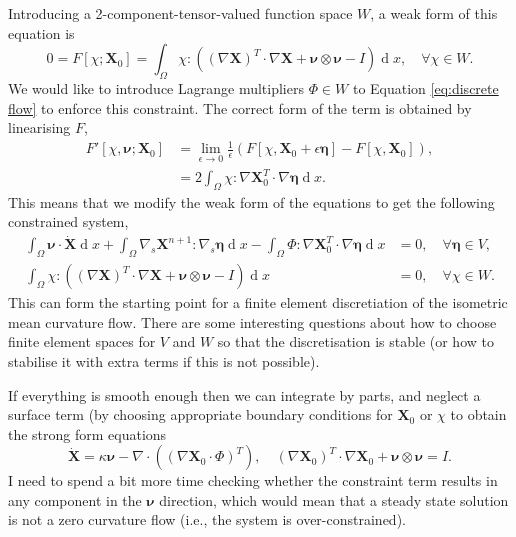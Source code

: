 \documentclass{article}
\def\MM#1{\boldsymbol{#1}}
\def\MM#1{\boldsymbol{#1}}
\DeclareMathOperator{\diff}{d}
\begin{document}
Introducing a 2-component-tensor-valued function space $W$, a weak
form of this equation is
\begin{equation} 
0 = F[\chi;\MM{X}_0] = \int_\Omega \chi : \left(
(\nabla\MM{X})^T\cdot\nabla\MM{X} + \MM{\nu}\otimes\MM{\nu} - I\right)\diff x,
\quad \forall \chi \in W.
\end{equation}
We would like to introduce Lagrange multipliers $\Phi\in W$ to
Equation \eqref{eq:discrete flow} to enforce this constraint. The correct
form of the term is obtained by linearising $F$,
\begin{align}
  F'[\chi,\MM{\nu};\MM{X}_0] & =
  \lim_{\epsilon\to 0}\frac{1}{\epsilon}
  \left(F[\chi,\MM{X}_0+\epsilon \MM{\eta}] - F[\chi,\MM{X}_0]\right), \\
  & = 2\int_\Omega \chi:\nabla\MM{X}^T_0\cdot \nabla\MM{\eta}\diff x.
\end{align}
This means that we modify the weak form of the equations to get the
following constrained system,
\begin{align}
\int_\Omega \MM{\nu} \cdot \dot{\MM{X}} \diff x
+\int_\Omega \nabla_s \MM{X}^{n+1} : \nabla_s \MM{\MM{\eta}}\diff x 
- \int_\Omega \Phi : \nabla\MM{X}^T_0\cdot \nabla\MM{\eta}\diff x &= 0,
\quad \forall \MM{\MM{\eta}}\in V, \\
\int_\Omega \chi : \left(
(\nabla\MM{X})^T\cdot\nabla\MM{X} + \MM{\nu}\otimes\MM{\nu} - I\right)\diff x & =
0, 
\quad \forall \chi \in W.
\end{align}
This can form the starting point for a finite element discretiation of
the isometric mean curvature flow. There are some interesting
questions about how to choose finite element spaces for $V$ and $W$ so
that the discretisation is stable (or how to stabilise it with extra
terms if this is not possible).

If everything is smooth enough then we can integrate by parts, and neglect
a surface term (by choosing appropriate boundary conditions for $\MM{X}_0$ or
$\chi$ to obtain the strong form equations
\begin{equation}
  \dot{\MM{X}} = \kappa\MM{\nu} - \nabla\cdot\left(\left(\nabla\MM{X}_0\cdot\Phi\right)^T\right),
  \quad (\nabla \MM{X}_0)^T\cdot \nabla \MM{X}_0 + \MM{\nu}\otimes\MM{\nu} = I.
\end{equation}
I need to spend a bit more time checking whether the constraint term
results in any component in the $\MM{\nu}$ direction, which would mean that
a steady state solution is not a zero curvature flow (i.e., the system
is over-constrained).
\end{document}
